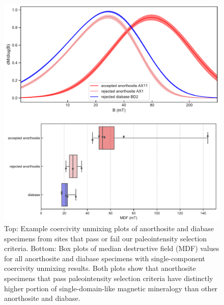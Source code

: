 \documentclass[9pt,twocolumn,twoside,lineno]{pnas-new}
\begin{document}
\begin{figure}
\noindent\includegraphics[width=\linewidth]{coercivity.pdf}
\centering
\caption{\footnotesize{Top: Example coercivity unmixing plots of anorthosite and diabase specimens from sites that pass or fail our paleointensity selection criteria. Bottom: Box plots of median destructive field (MDF) values for all anorthosite and diabase specimens with single-component coercivity unmixing results. Both plots show that anorthosite specimens that pass paleointensity selection criteria have distinctly higher portion of single-domain-like magnetic mineralogy than other anorthosite and diabase.}}
\label{fig:coercivity}
\end{figure}
\end{document}
